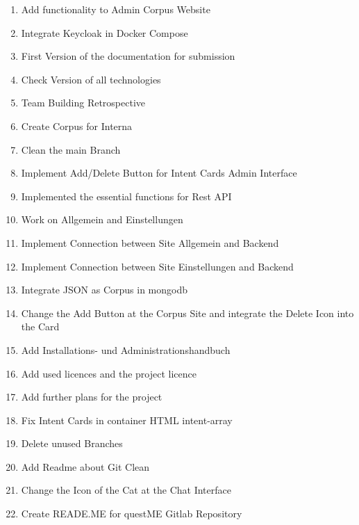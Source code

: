 \begin{enumerate}
\item Add functionality to Admin Corpus Website
\item Integrate Keycloak in Docker Compose
\item First Version of the documentation for submission
\item Check Version of all technologies
\item Team Building Retrospective
\item Create Corpus for Interna
\item Clean the main Branch
\item Implement Add/Delete Button for Intent Cards Admin Interface
\item Implemented the essential functions for Rest API
\item Work on Allgemein and Einstellungen
\item Implement Connection between Site Allgemein and Backend
\item Implement Connection between Site Einstellungen and Backend
\item Integrate JSON as Corpus in mongodb
\item Change the Add Button at the Corpus Site and integrate the Delete Icon into the Card
\item Add Installations- und Administrationshandbuch
\item Add used licences and the project licence
\item Add further plans for the project
\item Fix Intent Cards in container HTML intent-array
\item Delete unused Branches
\item Add Readme about Git Clean
\item Change the Icon of the Cat at the Chat Interface
\item Create READE.ME for questME Gitlab Repository
\end{enumerate}

